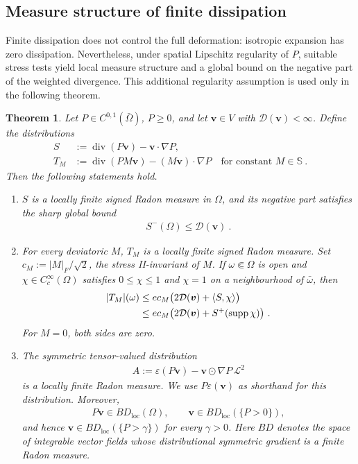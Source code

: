 \documentclass{article}
\newtheorem{theorem}{Theorem}[section]
\theoremstyle{definition}
\newcommand{\bfv}{\boldsymbol{v}}
\newcommand{\D}{\mathcal{D}}
\renewcommand\div{\operatorname{\mathrm{div}}}
\DeclareMathOperator{\supp}{supp}
\begin{document}
\subsection{Measure structure of finite dissipation}
Finite dissipation does not control the full deformation: isotropic
expansion has zero dissipation. Nevertheless, under spatial Lipschitz
regularity of $P$, suitable stress tests yield local measure structure and
a global bound on the negative part of the weighted divergence. This
additional regularity assumption is used only in the following theorem.

\begin{theorem}\label{th:measure_structure}
    Let $P\in C^{0,1}(\bar\Omega)$, $P\geq0$, and let $\bfv\in V$ with
    $\D(\bfv)<\infty$. Define the distributions
    \begin{align*}
        S&:=\div(P\bfv)-\bfv\cdot\nabla P,\\
        T_M&:=\div(PM\bfv)-(M\bfv)\cdot\nabla P
        \quad\text{for constant }M\in\mathbb S \ .
    \end{align*}
    Then the following statements hold.
    \begin{enumerate}
        \item[(a)] $S$ is a locally finite signed Radon measure in $\Omega$,
        and its negative part satisfies the sharp global bound
        \begin{align}
            S^-(\Omega)\leq\D(\bfv) \ .\label{eq:S-}
        \end{align}
        \item[(b)] For every deviatoric $M$, $T_M$ is a locally finite signed
        Radon measure. Set $c_M:=|M|_F/\sqrt{2}$, the stress II-invariant of
        $M$. If $\omega\Subset\Omega$ is open and
        $\chi\in C_c^\infty(\Omega)$ satisfies $0\leq\chi\leq1$ and
        $\chi=1$ on a neighbourhood of $\bar\omega$, then
        \begin{align}
            |T_M|(\omega)
            &\leq e c_M\bigl(2\D(\bfv)+\langle S,\chi\rangle\bigr)
            \notag\\
            &\leq e c_M\bigl(2\D(\bfv)+S^+(\supp\chi)\bigr) \ .
            \label{eq:TM}
        \end{align}
        For $M=0$, both sides are zero.
        \item[(c)] The symmetric tensor-valued distribution
        \begin{align}
            A:=\varepsilon(P\bfv)-\bfv\odot\nabla P\,\mathcal{L}^2
            \label{eq:weighted_deformation}
        \end{align}
        is a locally finite Radon measure. We use $P\varepsilon(\bfv)$ as
        shorthand for this distribution. Moreover,
        \begin{align*}
            P\bfv\in BD_{\mathrm{loc}}(\Omega),\qquad
            \bfv\in BD_{\mathrm{loc}}(\{P>0\}),
        \end{align*}
        and hence $\bfv\in BD_{\mathrm{loc}}(\{P>\gamma\})$ for every
        $\gamma>0$. Here $BD$ denotes the space of integrable vector fields
        whose distributional symmetric gradient is a finite Radon measure.
    \end{enumerate}
\end{theorem}
\end{document}
